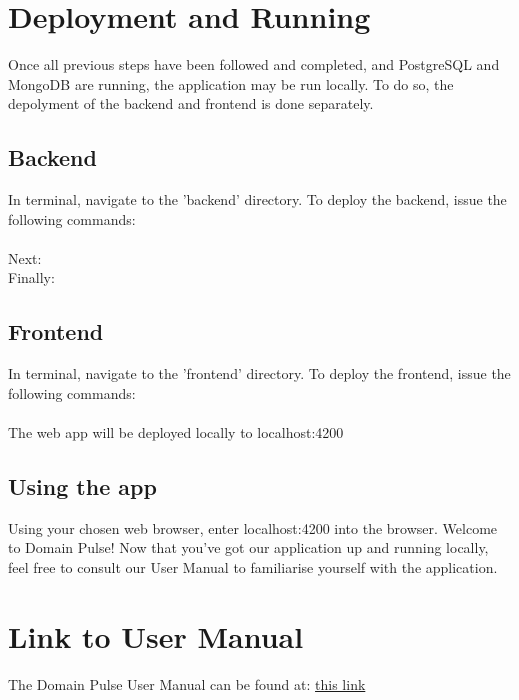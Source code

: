 \documentclass[12pt]{article}
\begin{document}
\section{Deployment and Running}
Once all previous steps have been followed and completed, and PostgreSQL and MongoDB are running, the application may be run locally. To do so,
the depolyment of the backend and frontend is done separately.
\subsection{Backend}
In terminal, navigate to the 'backend' directory. To deploy the backend, issue the following commands:\\ 
\\Next: \\
Finally: \\

\subsection{Frontend}
In terminal, navigate to the 'frontend' directory. To deploy the frontend, issue the following commands:\\
\\
The web app will be deployed locally to localhost:4200

\subsection{Using the app}
Using your chosen web browser, enter localhost:4200 into the browser. Welcome to Domain Pulse! Now that you've got our application
up and running locally, feel free to consult our User Manual to familiarise yourself with the application.

\section{Link to User Manual}
The Domain Pulse User Manual can be found at: \href{https://drive.google.com/file/d/1RfX-JaYZYNz132iGOhiku9E_y4466YqW/view?usp=sharing}{this link}
\end{document}
